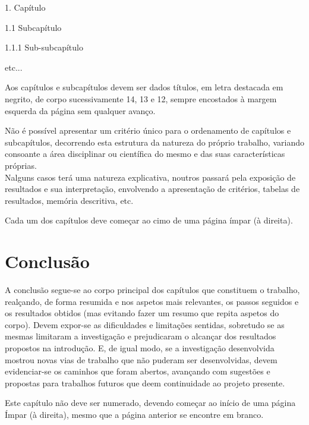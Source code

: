 1. Capítulo 

1.1 Subcapítulo 

1.1.1 Sub-subcapítulo 

etc...

Aos capítulos e subcapítulos devem ser dados títulos, em letra destacada em negrito, de corpo sucessivamente 14, 13 e 12, sempre encostados à margem esquerda da página sem qualquer avanço.

Não é possível apresentar um critério único para o ordenamento de capítulos e subcapítulos, decorrendo esta estrutura da natureza do próprio trabalho, variando consoante a área disciplinar ou científica do mesmo e das suas características próprias.\\
Nalguns casos terá uma natureza explicativa, noutros passará pela exposição de resultados e sua interpretação, envolvendo a apresentação de critérios, tabelas de resultados, memória descritiva, etc.

Cada um dos capítulos deve começar ao cimo de uma página ímpar (à direita).

\section{Conclusão}
A conclusão segue-se ao corpo principal dos capítulos que constituem o trabalho, realçando, de forma resumida e nos aspetos mais relevantes, os passos seguidos e os resultados obtidos (mas evitando fazer um resumo que repita aspetos do corpo). Devem expor-se as dificuldades e limitações sentidas, sobretudo se as mesmas limitaram a investigação e prejudicaram o alcançar dos resultados propostos na introdução. E, de igual modo, se a investigação desenvolvida mostrou novas vias de trabalho que não puderam ser desenvolvidas, devem evidenciar-se os caminhos que foram abertos, avançando com sugestões e propostas para trabalhos futuros que deem continuidade ao projeto presente.

Este capítulo não deve ser numerado, devendo começar ao início de uma página Ímpar (à direita), mesmo que a página anterior se encontre em branco.